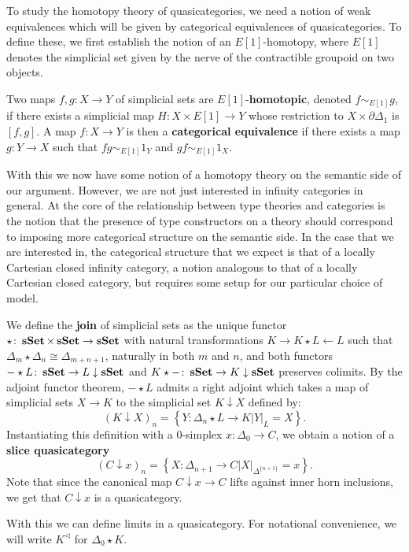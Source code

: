 \documentclass{amsart}
\begin{document}
To study the homotopy theory of quasicategories, we need a notion of weak equivalences which will be given by categorical equivalences of quasicategories. To define these, we first establish the notion of an $E[1]$-homotopy, where $E[1]$ denotes the simplicial set given by the nerve of the contractible groupoid on two objects.
\begin{defn}
    Two maps $f,g\colon X\to Y$ of simplicial sets are $E[1]$-\textbf{homotopic}, denoted $f\sim_{E[1]} g$, if there exists a simplicial map $H\colon X\times E[1]\to Y$ whose restriction to $X\times\partial\Delta_1$ is $[f,g]$. A map $f\colon X\to Y$ is then a \textbf{categorical equivalence} if there exists a map $g\colon Y\to X$ such that $fg\sim_{E[1]}1_Y$ and $gf\sim_{E[1]}1_X$.
\end{defn}
With this we now have some notion of a homotopy theory on the semantic side of our argument. However, we are not just interested in infinity categories in general. At the core of the relationship between type theories and categories is the notion that the presence of type constructors on a theory should correspond to imposing more categorical structure on the semantic side. In the case that we are interested in, the categorical structure that we expect is that of a locally Cartesian closed infinity category, a notion analogous to that of a locally Cartesian closed category, but requires some setup for our particular choice of model.

We define the \textbf{join} of simplicial sets as the unique functor $\star\colon\operatorname{\mathbf{sSet}}\times\operatorname{\mathbf{sSet}}\to\operatorname{\mathbf{sSet}}$ with natural transformations \(K\to K\star L\leftarrow L\) such that $\Delta_m\star\Delta_n\cong\Delta_{m+n+1}$, naturally in both $m$ and $n$, and both functors $-\star L\colon\operatorname{\mathbf{sSet}}\to L\downarrow\operatorname{\mathbf{sSet}}$ and $K\star-\colon\operatorname{\mathbf{sSet}}\to K\downarrow\operatorname{\mathbf{sSet}}$ preserves colimits. By the adjoint functor theorem, $-\star L$ admits a right adjoint which takes a map of simplicial sets $X\to K$ to the simplicial set $K\downarrow X$ defined by:
\[(K\downarrow X)_n=\left\{Y\colon\Delta_n\star L\to K\mathrel{\Big|} Y\vert_L=X\right\}.\]
Instantiating this definition with a 0-simplex $x\colon\Delta_0\to C$, we obtain a notion of a \textbf{slice quasicategory}
\[(C\downarrow x)_n=\left\{X\colon\Delta_{n+1}\to C\mathrel{\Big|}X\vert_{\Delta^{\{n+1\}}}=x\right\}.\]
Note that since the canonical map $C\downarrow x\to C$ lifts against inner horn inclusions, we get that $C\downarrow x$ is a quasicategory.

With this we can define limits in a quasicategory. For notational convenience, we will write $K^\lhd$ for $\Delta_0\star K$.
\end{document}
